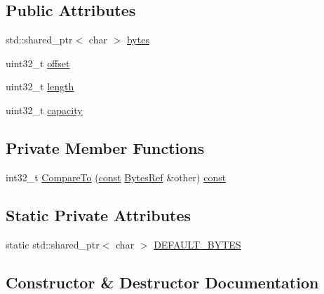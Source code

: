 \subsection*{Public Attributes}
\begin{DoxyCompactItemize}
\item 
std\+::shared\+\_\+ptr$<$ char $>$ \mbox{\hyperlink{classlucene_1_1core_1_1util_1_1BytesRef_a50b260da81b7f31687ac167ff52c9a1c}{bytes}}
\item 
uint32\+\_\+t \mbox{\hyperlink{classlucene_1_1core_1_1util_1_1BytesRef_a00b5e81a37602c7af1fde636cd44f12b}{offset}}
\item 
uint32\+\_\+t \mbox{\hyperlink{classlucene_1_1core_1_1util_1_1BytesRef_a198e62928759942ffc9d2c3ff877b4e4}{length}}
\item 
uint32\+\_\+t \mbox{\hyperlink{classlucene_1_1core_1_1util_1_1BytesRef_a9e1775d26ac1dec137aa57fae87f654c}{capacity}}
\end{DoxyCompactItemize}
\subsection*{Private Member Functions}
\begin{DoxyCompactItemize}
\item 
int32\+\_\+t \mbox{\hyperlink{classlucene_1_1core_1_1util_1_1BytesRef_a028de5040f03a4f1508986699263f952}{Compare\+To}} (\mbox{\hyperlink{ZlibCrc32_8h_a2c212835823e3c54a8ab6d95c652660e}{const}} \mbox{\hyperlink{classlucene_1_1core_1_1util_1_1BytesRef}{Bytes\+Ref}} \&other) \mbox{\hyperlink{ZlibCrc32_8h_a2c212835823e3c54a8ab6d95c652660e}{const}}
\end{DoxyCompactItemize}
\subsection*{Static Private Attributes}
\begin{DoxyCompactItemize}
\item 
static std\+::shared\+\_\+ptr$<$ char $>$ \mbox{\hyperlink{classlucene_1_1core_1_1util_1_1BytesRef_abcb0c93627877d9d8b01889830e879b0}{D\+E\+F\+A\+U\+L\+T\+\_\+\+B\+Y\+T\+ES}}
\end{DoxyCompactItemize}


\subsection{Constructor \& Destructor Documentation}
\mbox{\label{classlucene_1_1core_1_1util_1_1BytesRef_a5c352a399671a6ed5e04cd334149b662}} 
